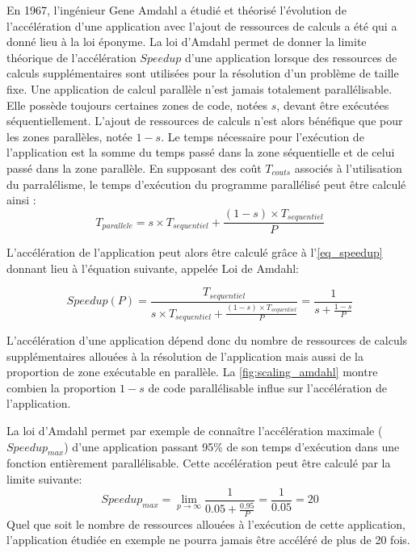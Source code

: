         
        En 1967, l'ingénieur Gene Amdahl a étudié et théorisé l'évolution de l'accélération d'une application avec l'ajout de ressources de calculs a été qui a donné lieu à la loi éponyme. La loi d'Amdahl permet de donner la limite théorique de l'accélération $Speedup$ d'une application lorsque des ressources de calculs supplémentaires sont utilisées pour la résolution d'un problème de taille fixe. Une application de calcul parallèle n'est jamais totalement parallélisable. Elle possède toujours certaines zones de code, notées $s$, devant être exécutées séquentiellement. L'ajout de ressources de calculs n'est alors bénéfique que pour les zones parallèles, notée $1-s$. Le temps nécessaire pour l'exécution de l'application est la somme du temps passé dans la zone séquentielle et de celui passé dans la zone parallèle. En supposant des coût $T_{couts}$ associés à l'utilisation du parralélisme, le temps d'exécution du programme parallélisé peut être calculé ainsi : 
        \begin{equation}
        T_{parallele} = s \times T_{sequentiel} + \frac{(1-s) \times T_{sequentiel}}{P}
        \end{equation}
        
        
        L'accélération de l'application peut alors être calculé grâce à l'\autoref{eq_speedup} donnant lieu à l'équation suivante, appelée Loi de Amdahl:
        
                
        \begin{equation}
        \label{eq_amdahl}
        Speedup (P) = \frac{T_{sequentiel}}{s \times T_{sequentiel} + \frac{(1-s) \times T_{sequentiel}}{P}} =  \frac{1}{s + \frac{1-s}{P}}
        \end{equation}
        
        L'accélération d'une application dépend donc du nombre de ressources de calculs supplémentaires allouées à la résolution de l'application mais aussi de la proportion de zone exécutable en parallèle. La \autoref{fig:scaling_amdahl} montre combien la proportion $1-s$ de code parallélisable influe sur l'accélération de l'application. 
  
        La loi d'Amdahl permet par exemple de connaître l'accélération maximale ($Speedup_{max}$) d'une application passant 95\% de son temps d'exécution dans une fonction entièrement parallélisable. Cette accélération peut être calculé par la limite suivante:
        \begin{equation}
        Speedup_{max} =  \lim_{p\to\infty}    \frac{1}{0.05 + \frac{0.95}{P}} = \frac{1}{0.05} = 20
        \end{equation}
        Quel que soit le nombre de ressources allouées à l'exécution de cette application, l'application étudiée en exemple ne pourra jamais être accéléré de plus de 20 fois.  
       

